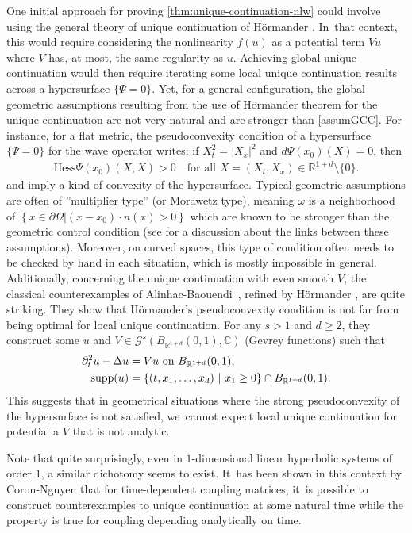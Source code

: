 \documentclass[10pt]{amsart}
\DeclareMathOperator{\supp}{\mathrm{supp}}
\theoremstyle{definition}
\newcommand{\R}{\mathbb{R}}
\begin{document}
One initial approach for proving \cref{thm:unique-continuation-nlw} could involve using the general theory of unique continuation of Hörmander \cite{H:63}. In~that context, this would require considering the nonlinearity $f(u)$ as a potential term $Vu$ where $V$ has, at most, the same regularity as $u$. Achieving global unique continuation would then require iterating some local unique continuation results across a hypersurface $\{\Psi=0\}$. Yet, for a general configuration, the global geometric assumptions resulting from the use of Hörmander theorem for the unique continuation are not very natural and are stronger than \ref{assumGCC}. For instance, for a flat metric, the pseudoconvexity condition of a hypersurface $\{\Psi=0\}$ for the wave operator writes: if $X_{t}^{2}=|X_{x}|^{2}$ and $d\Psi(x_0)(X)=0$, then
\begin{align*}
\text{Hess} \Psi(x_0) (X , X) >0 \quad \text{for all } X=(X_{t},X_{x}) \in \R^{1+d} \setminus \{0\}.
\end{align*}
and imply a kind of convexity of the hypersurface. Typical geometric assumptions are often of ''multiplier type'' (or Morawetz type), meaning $\omega$ is a neighborhood of $\left\{x\in \partial\Omega \left|(x-x_0)\cdot n(x)>0\right.\right\}$ which are known to be stronger than the geometric control condition (see \cite{M:03} for a discussion about the links between these assumptions). Moreover, on curved spaces, this type of condition often needs to be checked by hand in each situation, which is mostly impossible in general. Additionally, concerning the unique continuation with even smooth $V$, the classical counterexamples of Alinhac-Baouendi~\cite{AB:95}, refined by Hörmander \cite{H:00}, are quite striking. They show that Hörmander's pseudoconvexity condition is not far from being optimal for local unique continuation. For any $s>1$ and $d\geq 2$, they construct some $u$ and $V \in \mathcal{G}^s(B_{\R^{1+d}}(0,1), \mathbb{C})$ (Gevrey functions) such that
\begin{align*}
\partial_{t}^{2}u-\Delta u&=V u \textnormal{ on }B_{\R^{1+d}}(0,1),\\
\supp(u)&=\left\{(t,x_{1},\dots, x_{d})\ |\ x_{1}\geq 0\right\}\cap B_{\R^{1+d}}(0,1).
\end{align*}
This suggests that in geometrical situations where the strong pseudoconvexity of the hypersurface is not satisfied, we~cannot expect local unique continuation for potential a $V$ that is not analytic.

Note that quite surprisingly, even in $1$-dimensional linear hyperbolic systems of order $1$, a similar dichotomy seems to exist. It~has been shown in this context by Coron-Nguyen \cite{CN:21} that for time-dependent coupling matrices, it~is possible to construct counterexamples to unique continuation at some natural time while the property is true for coupling depending analytically on time.
\end{document}
